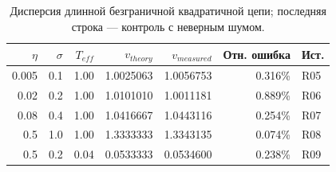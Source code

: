 \begin{table}[H]\centering\small
\setlength{\tabcolsep}{4pt}
\caption{Дисперсия длинной безграничной квадратичной цепи; последняя строка --- контроль с неверным шумом.}\label{tab:quadratic}
\begin{tabular}{rrrrrrl}
\toprule
$\eta$ & $\sigma$ & $T_{eff}$ & $v_{theory}$ & $v_{measured}$ & Отн. ошибка & Ист. \\
\midrule
0.005 & 0.1 & 1.00 & 1.0025063 & 1.0056753 & 0.316\% & R05 \\
0.02 & 0.2 & 1.00 & 1.0101010 & 1.0011181 & 0.889\% & R06 \\
0.08 & 0.4 & 1.00 & 1.0416667 & 1.0443116 & 0.254\% & R07 \\
0.5 & 1.0 & 1.00 & 1.3333333 & 1.3343135 & 0.074\% & R08 \\
0.5 & 0.2 & 0.04 & 0.0533333 & 0.0534600 & 0.238\% & R09 \\
\bottomrule
\end{tabular}
\end{table}
